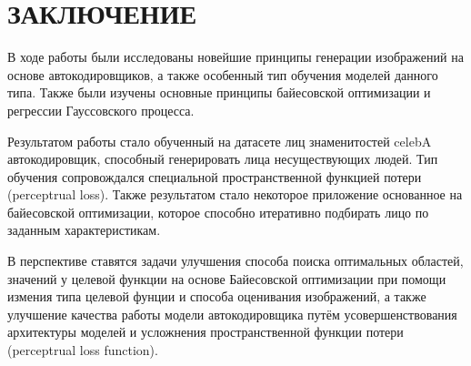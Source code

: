\chapter*{ \large ЗАКЛЮЧЕНИЕ}
В ходе работы были исследованы новейшие принципы генерации изображений на основе автокодировщиков, а также особенный тип обучения моделей данного типа. Также были изучены основные принципы байесовской оптимизации и регрессии Гауссовского процесса.

Результатом работы стало обученный на датасете лиц знаменитостей celebA автокодировщик, способный генерировать лица несуществующих людей. Тип обучения сопровождался специальной пространственной функцией потери \\ (perceptrual loss). Также результатом стало некоторое приложение основанное на байесовской оптимизации, которое способно итеративно подбирать лицо по заданным характеристикам.

В перспективе ставятся задачи улучшения способа поиска оптимальных областей, значений у целевой функции на основе Байесовской оптимизации при помощи измения типа целевой фунции и способа оценивания изображений, а также улучшение качества работы модели автокодировщика путём усовершенствования архитектуры моделей и усложнения пространственной функции потери (perceptrual loss function).